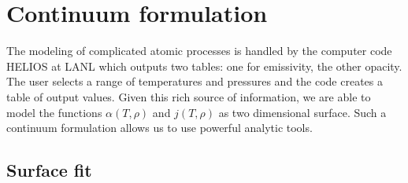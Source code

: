 \chapter{\label{ch:continuum formulation}Continuum formulation}

The modeling of complicated atomic processes is handled by the computer code HELIOS at LANL which outputs two tables: one for emissivity, the other opacity. The user selects a range of temperatures and pressures and the code creates a table of output values. Given this rich source of information, we are able to model the functions $\alpha(T,\rho)$ and $j(T,\rho)$ as two dimensional surface. Such a continuum formulation allows us to use powerful analytic tools.

\section{Surface fit}

%

\endinput %